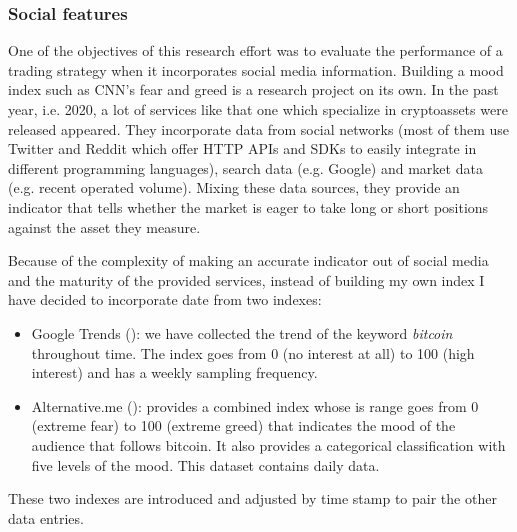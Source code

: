 \subsubsection{Social features}
\label{sec:material_data_social_features}

One of the objectives of this research effort was to evaluate the performance of a trading strategy when it incorporates social media information. Building a mood index such as CNN's fear and greed \cite{cnn_fear_and_greed} is a research project on its own. In the past year, i.e. 2020, a lot of services like that one which specialize in cryptoassets were released appeared. They incorporate data from social networks (most of them use Twitter and Reddit which offer HTTP APIs and SDKs to easily integrate in different programming languages), search data (e.g. Google) and market data (e.g. recent operated volume). Mixing these data sources, they provide an indicator that tells whether the market is eager to take long or short positions against the asset they measure.

Because of the complexity of making an accurate indicator out of social media and the maturity of the provided services, instead of building my own index I have decided to incorporate date from two indexes:

\begin{itemize}
    \item Google Trends (\cite{google_trends_terms_of_use}): we have collected the trend of the keyword \emph{bitcoin} throughout time. The index goes from 0 (no interest at all) to 100 (high interest) and has a weekly sampling frequency. 
    \item Alternative.me (\cite{alternative_me}): provides a combined index whose is range goes from 0 (extreme fear) to 100 (extreme greed) that indicates the mood of the audience that follows bitcoin. It also provides a categorical classification with five levels of the mood. This dataset contains daily data.
\end{itemize}

These two indexes are introduced and adjusted by time stamp to pair the other data entries.